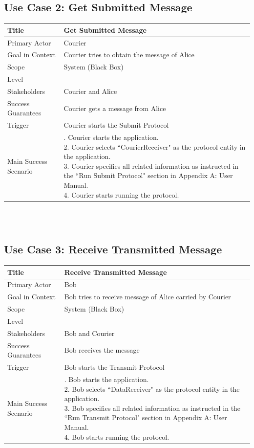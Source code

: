 \subsection*{Use Case 2: Get Submitted Message} 
\begin{tabular}{|l|p{}|}
 \hline
 Title & Get Submitted Message \\ \hline
 Primary Actor & Courier \\ \hline
 Goal in Context & Courier tries to obtain the message of Alice \\ \hline
 Scope & System (Black Box) \\ \hline
 Level & \\ \hline
 Stakeholders & Courier and Alice \\ \hline
 Success Guarantees & Courier gets a message from Alice \\ \hline
 Trigger & Courier starts the Submit Protocol \\ \hline
 Main Success Scenario & 
 \parbox{9cm}{
  . Courier starts the application. \\
  2. Courier selects ``CourierReceiver" as the protocol entity in the application. \\
  3. Courier specifies all related information as instructed in the ``Run Submit Protocol" section in Appendix A: User Manual. \\
  4. Courier starts running the protocol.
  \medskip
 }
 \\ \hline
\end{tabular}
\\
\\
\subsection*{Use Case 3: Receive Transmitted Message} 
\begin{tabular}{|l|p{}|}
 \hline
 Title & Receive Transmitted Message \\ \hline
 Primary Actor & Bob \\ \hline
 Goal in Context & Bob tries to receive message of Alice carried by Courier \\ \hline
 Scope & System (Black Box) \\ \hline
 Level & \\ \hline
 Stakeholders & Bob and Courier \\ \hline
 Success Guarantees & Bob receives the message \\ \hline
 Trigger & Bob starts the Transmit Protocol \\ \hline
 Main Success Scenario & 
 \parbox{9cm}{
  . Bob starts the application. \\
  2. Bob selects ``DataReceiver" as the protocol entity in the application. \\
  3. Bob specifies all related information as instructed in the ``Run Transmit Protocol" section in Appendix A: User Manual. \\
  4. Bob starts running the protocol.
  \medskip
 }
 \\ \hline
\end{tabular}
\\ 
\\
